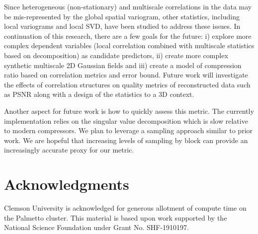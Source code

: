 \documentclass[conference]{IEEEtran}
\begin{document}
Since heterogeneous (non-stationary) and multiscale correlations in the data may be mis-represented by the global spatial variogram, other statistics, including local variograms and local SVD, have been studied to address these issues. 
In continuation of this research, there are a few goals for the future: i) explore more complex dependent variables (local correlation combined with multiscale statistics based on decomposition) as candidate predictors,  ii) create  more complex synthetic multiscale 2D Gaussian fields and iii) create a model of compression ratio based on correlation metrics and error bound. 
Future work will investigate the effects of correlation structures  on quality metrics of reconstructed data such as PSNR along with  a design of the statistics to a 3D context.  


Another aspect for future work is how to quickly assess this metric.
The currently implementation relies on the singular value decomposition which is slow relative to modern compressors.
We plan to leverage a sampling approach similar to prior work\cite{taoOptimizingLossyCompression2019,lu2018understanding}. We are hopeful that increasing levels of sampling by block can provide an increasingly accurate proxy for our metric.

\section*{Acknowledgments}
Clemson University is acknowledged for generous allotment of compute time on the Palmetto cluster. This material is based upon work supported by the National Science Foundation under Grant No. SHF-1910197.




\end{document}
